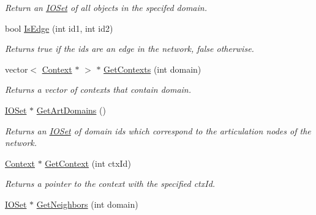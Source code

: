 \begin{DoxyCompactItemize}
\begin{DoxyCompactList}\small\item\em Return an \hyperlink{class_i_o_set}{IOSet} of all objects in the specifed domain. \item\end{DoxyCompactList}\item 
bool \hyperlink{class_relation_graph_a647ab3afb7708f13e5ec480462dedb39}{IsEdge} (int id1, int id2)
\begin{DoxyCompactList}\small\item\em Returns true if the ids are an edge in the network, false otherwise. \item\end{DoxyCompactList}\item 
\hypertarget{class_relation_graph_acd16774976073a33da14d8461ba4165d}{
vector$<$ \hyperlink{class_context}{Context} $\ast$ $>$ $\ast$ \hyperlink{class_relation_graph_acd16774976073a33da14d8461ba4165d}{GetContexts} (int domain)}
\label{class_relation_graph_acd16774976073a33da14d8461ba4165d}

\begin{DoxyCompactList}\small\item\em Returns a vector of contexts that contain domain. \item\end{DoxyCompactList}\item 
\hypertarget{class_relation_graph_adf3c6bb0287acf5e5569b88a3d3a9326}{
\hyperlink{class_i_o_set}{IOSet} $\ast$ \hyperlink{class_relation_graph_adf3c6bb0287acf5e5569b88a3d3a9326}{GetArtDomains} ()}
\label{class_relation_graph_adf3c6bb0287acf5e5569b88a3d3a9326}

\begin{DoxyCompactList}\small\item\em Returns an \hyperlink{class_i_o_set}{IOSet} of domain ids which correspond to the articulation nodes of the network. \item\end{DoxyCompactList}\item 
\hypertarget{class_relation_graph_afb733508ef74b8b09adda722af855f32}{
\hyperlink{class_context}{Context} $\ast$ \hyperlink{class_relation_graph_afb733508ef74b8b09adda722af855f32}{GetContext} (int ctxId)}
\label{class_relation_graph_afb733508ef74b8b09adda722af855f32}

\begin{DoxyCompactList}\small\item\em Returns a pointer to the context with the specified ctxId. \item\end{DoxyCompactList}\item 
\hypertarget{class_relation_graph_a82dafd34929842c2ddf93d42551db4f1}{
\hyperlink{class_i_o_set}{IOSet} $\ast$ \hyperlink{class_relation_graph_a82dafd34929842c2ddf93d42551db4f1}{GetNeighbors} (int domain)}
\label{class_relation_graph_a82dafd34929842c2ddf93d42551db4f1}


\end{DoxyCompactItemize}

